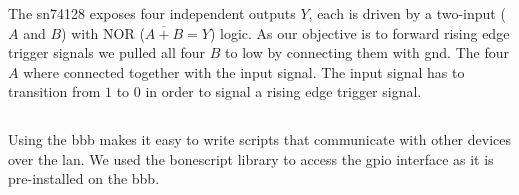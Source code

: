 The \gls{sn74128} exposes four independent outputs $Y$, each is driven by a
two-input ($A$ and $B$) with NOR ($\overline{A+B}=Y$) logic. As our objective
is to forward rising edge trigger signals we pulled all four $B$ to low by
connecting them with \gls{gnd}. The four $A$ where connected together with
the input signal. The input signal has to transition from $1$ to $0$ in order
to signal a rising edge trigger signal.

\begin{listing}[h]
  \inputminted[xleftmargin=.2\linewidth]{javascript}{scripts/trigger.js}
  \captionsetup{width=.6\linewidth}
  \caption{\gls{bbb} script that starts a \gls{http} server to listen for
requests on which to trigger a rising edge signal. On execution it pulls the
signal \gls{gpio} to high. The request callback then pulls the \gls{gpio} to
low for one \SI{1}{\milli\second}.}
\end{listing}

Using the \gls{bbb} makes it easy to write scripts that communicate with
other devices over the \gls{lan}. We used the bonescript library to access
the \gls{gpio} interface as it is pre-installed on the \gls{bbb}.

